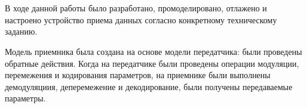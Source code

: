 \documentclass[a4paper,12pt]{article}
\begin{document}
\begin{enumerate}
{\item
{}
\\}

{\item
{}
\\}

{\bfseries{}}

В ходе данной работы было разработано, промоделировано, отлажено и настроено устройство приема данных согласно конкретному техническому заданию. 

Модель приемника была создана на основе модели передатчика: были проведены обратные действия. Когда на передатчике были проведены операции модуляции, перемежения и кодирования параметров, на приемнике были выполнены демодуляциия, деперемежение и декодирование, были получены передаваемые параметры.

\end{enumerate}
\end{document}
